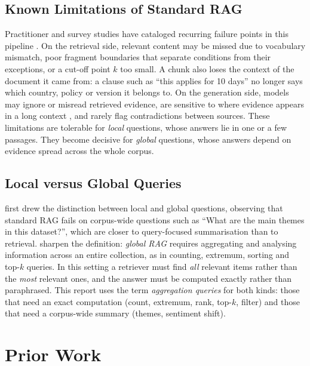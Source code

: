 \documentclass[11pt,letterpaper,oneside]{report}
\begin{document}
\subsection{Known Limitations of Standard RAG}
Practitioner and survey studies have cataloged recurring failure points in
this pipeline \citep{barnett2024sevenfailure,gao2023ragsurvey}. On the
retrieval side, relevant content may be missed due to vocabulary
mismatch, poor fragment boundaries that separate conditions from their
exceptions, or a cut-off point $k$ too small. A chunk also loses the
context of the document it came from: a clause such as ``this applies for
10 days'' no longer says which country, policy or version it belongs to. On
the generation side, models may ignore or misread retrieved evidence, are
sensitive to where evidence appears in a long context
\citep{liu2024lostmiddle}, and rarely flag contradictions between sources.
These limitations are tolerable for \emph{local} questions, whose answers lie
in one or a few passages. They become decisive for \emph{global} questions,
whose answers depend on evidence spread across the whole corpus.

\subsection{Local versus Global Queries}
\citet{edge2024graphrag} first drew the distinction between local and global
questions, observing that standard RAG fails on corpus-wide questions such as
``What are the main themes in this dataset?'', which are closer to
query-focused summarisation than to retrieval. \citet{luo2025globalrag}
sharpen the definition: \emph{global RAG} requires aggregating and analysing
information across an entire collection, as in counting, extremum, sorting
and top-$k$ queries. In this setting a retriever must find \emph{all}
relevant items rather than the \emph{most} relevant ones, and the answer must
be computed exactly rather than paraphrased. This report uses the term
\emph{aggregation queries} for both kinds: those that need an exact
computation (count, extremum, rank, top-$k$, filter) and those that need a
corpus-wide summary (themes, sentiment shift).

\section{Prior Work}
\label{sec:prior}
\end{document}

